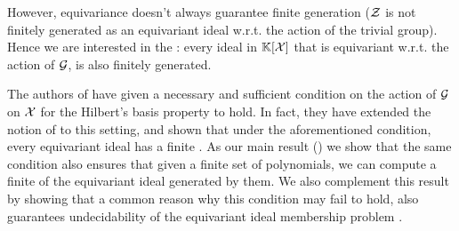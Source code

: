 However, equivariance doesn't always guarantee finite generation ($\mathcal{Z}$ is not finitely generated as an equivariant ideal w.r.t. the action of the trivial group).
Hence we are interested in the :
every ideal in $\mathbb{K}[\mathcal{X}]$ that is equivariant w.r.t. the action of $\mathcal{G}$,
is also finitely generated.

The authors of \cite{GHOLAS24} have given a necessary and sufficient condition  
on the action of $\mathcal{G}$ on $\mathcal{X}$ for the Hilbert's basis property to hold.
In fact, they have extended the notion of  to this setting,
and shown that under the aforementioned condition,
every equivariant ideal has a finite .
As our main result () we show that the same condition also ensures that given a finite set of polynomials,
we can compute a finite  of the equivariant ideal generated by them.
We also complement this result by showing that a common reason why this condition may fail to hold,
also guarantees undecidability of the equivariant ideal membership problem
.


